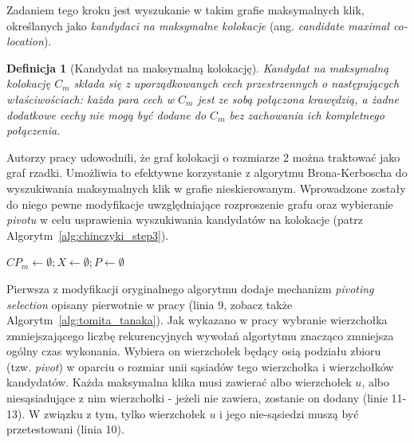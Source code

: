 \documentclass[12pt]{article}
\newtheorem{defin}{Definicja}
\begin{document}
Zadaniem tego kroku jest wyszukanie w takim grafie maksymalnych klik, określanych jako \textit{kandydaci na maksymalne kolokacje} (ang. \textit{candidate maximal co-location}).

\begin{defin}[Kandydat na maksymalną kolokację]
Kandydat na maksymalną kolokację $ C_{m} $ składa się z uporządkowanych cech przestrzennych o następujących właściwościach: każda para cech w  $ C_{m} $  jest ze sobą połączona krawędzią, a żadne dodatkowe cechy nie mogą być dodane do $ C_{m} $ bez zachowania ich kompletnego połączenia.
\end{defin}

Autorzy pracy \cite{chinczyki} udowodnili, że graf kolokacji o rozmiarze 2 można traktować jako graf rzadki. Umożliwia to efektywne korzystanie z algorytmu Brona-Kerboscha \cite{kerbosz} do wyszukiwania maksymalnych klik w grafie nieskierowanym. Wprowadzone zostały do niego pewne modyfikacje uwzględniające rozproszenie grafu oraz wybieranie \textit{pivotu} w celu usprawienia wyszukiwania kandydatów na kolokacje (patrz Algorytm~\ref{alg:chinczyki_step3}).

\begin{algorithm}

$CP_{m} \leftarrow \emptyset; X \leftarrow \emptyset; P \leftarrow \emptyset$\;

\caption{Generowanie maksymalnych kandydatów na kolokacje}
\label{alg:chinczyki_step3}
\end{algorithm}

Pierwsza z modyfikacji oryginalnego algorytmu dodaje mechanizm \textit{pivoting selection} opisany pierwotnie w pracy \cite{pivot} (linia 9, zobacz także Algorytm~\ref{alg:tomita_tanaka}). Jak wykazano w pracy \cite{pivot2} wybranie wierzchołka zmniejszającego liczbę rekurencyjnych wywołań algortytmu znacząco zmniejsza ogólny czas wykonania. Wybiera on wierzchołek będący osią podziału zbioru (tzw. \textit{pivot}) w oparciu o rozmiar unii sąsiadów tego wierzchołka i wierzchołków kandydatów. Każda maksymalna klika musi zawierać albo wierzchołek $ u $, albo niesąsiadujące z nim wierzchołki - jeżeli nie zawiera, zostanie on dodany (linie 11-13). W związku z tym, tylko wierzchołek $ u $ i jego nie-sąsiedzi muszą być przetestowani (linia 10).
\end{document}
